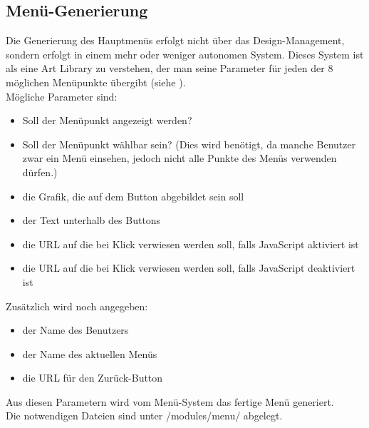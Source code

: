 \subsection{Menü-Generierung}
Die Generierung des Hauptmenüs erfolgt nicht über das Design-Management, sondern erfolgt in einem mehr oder weniger autonomen System. Dieses System ist als eine Art Library zu verstehen, der man seine Parameter für jeden der 8 möglichen Menüpunkte übergibt (siehe ).\\
Mögliche Parameter sind:
\begin{itemize}
	\item Soll der Menüpunkt angezeigt werden?
	\item Soll der Menüpunkt wählbar sein? (Dies wird benötigt, da manche Benutzer zwar ein Menü einsehen, jedoch nicht alle Punkte des Menüs verwenden dürfen.)
	\item die Grafik, die auf dem Button abgebildet sein soll
	\item der Text unterhalb des Buttons
	\item die URL auf die bei Klick verwiesen werden soll, falls JavaScript aktiviert ist
	\item die URL auf die bei Klick verwiesen werden soll, falls JavaScript deaktiviert ist
\end{itemize}
Zusätzlich wird noch angegeben:
\begin{itemize}
	\item der Name des Benutzers
	\item der Name des aktuellen Menüs
	\item die URL für den Zurück-Button
\end{itemize}
Aus diesen Parametern wird vom Menü-System das fertige Menü generiert.\\
Die notwendigen Dateien sind unter /modules/menu/ abgelegt.